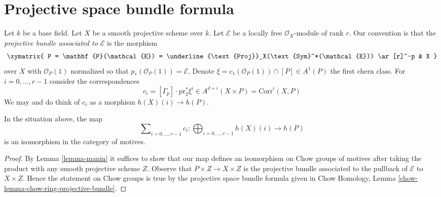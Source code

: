 \section{Projective space bundle formula}
\label{section-projective-space-bundle}

\noindent
Let $k$ be a base field. Let $X$ be a smooth projective scheme over $k$.
Let $\mathcal{E}$ be a locally free $\mathcal{O}_X$-module of rank $r$.
Our convention is that the {\it projective bundle associated to
$\mathcal{E}$} is the morphism
$$
\xymatrix{
P = \mathbf{P}(\mathcal{E}) =
\underline{\text{Proj}}_X(\text{Sym}^*(\mathcal{E}))
\ar[r]^-p
& X
}
$$
over $X$ with $\mathcal{O}_P(1)$ normalized so that
$p_*(\mathcal{O}_P(1)) = \mathcal{E}$.
Denote $\xi = c_1(\mathcal{O}_P(1)) \cap [P] \in A^1(P)$ the first
chern class. For $i = 0, \ldots, r - 1$ consider the correspondences
$$
c_i = [\Gamma_p] \cdot \text{pr}_2^*\xi^i \in
A^{d + i}(X \times P) = \text{Corr}^i(X, P)
$$
We may and do think of $c_i$ as a morphism $h(X)(i) \to h(P)$.

\begin{lemma}
\label{lemma-projective-space-bundle-formula}
In the situation above, the map
$$
\sum\nolimits_{i = 0, \ldots, r - 1} c_i :
\bigoplus\nolimits_{i = 0, \ldots, r - 1} h(X)(i)
\longrightarrow
h(P)
$$
is an isomorphism in the category of motives.
\end{lemma}

\begin{proof}
By Lemma \ref{lemma-manin} it suffices to show that
our map defines an isomorphism on Chow groups of motives
after taking the product with any smooth projective scheme $Z$.
Observe that $P \times Z \to X \times Z$ is the projective
bundle associated to the pullback of $\mathcal{E}$ to $X \times Z$.
Hence the statement on Chow groups is true
by the projective space bundle formula given
in Chow Homology, Lemma \ref{chow-lemma-chow-ring-projective-bundle}.
\end{proof}

